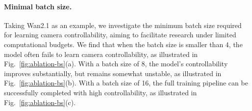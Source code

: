 \paragraph{Minimal batch size.}

Taking Wan2.1 as an example, we investigate the minimum batch size required for learning camera controllability, aiming to facilitate research under limited computational budgets. We find that when the batch size is smaller than 4, the model often fails to learn camera controllability, as illustrated in Fig.~\ref{fig:ablation-bs}(a). With a batch size of 8, the model's controllability improves substantially, but remains somewhat unstable, as illustrated in Fig.~\ref{fig:ablation-bs}(b). With a batch size of 16, the full training pipeline can be successfully completed with high controllability, as illustrated in Fig.~\ref{fig:ablation-bs}(c).






